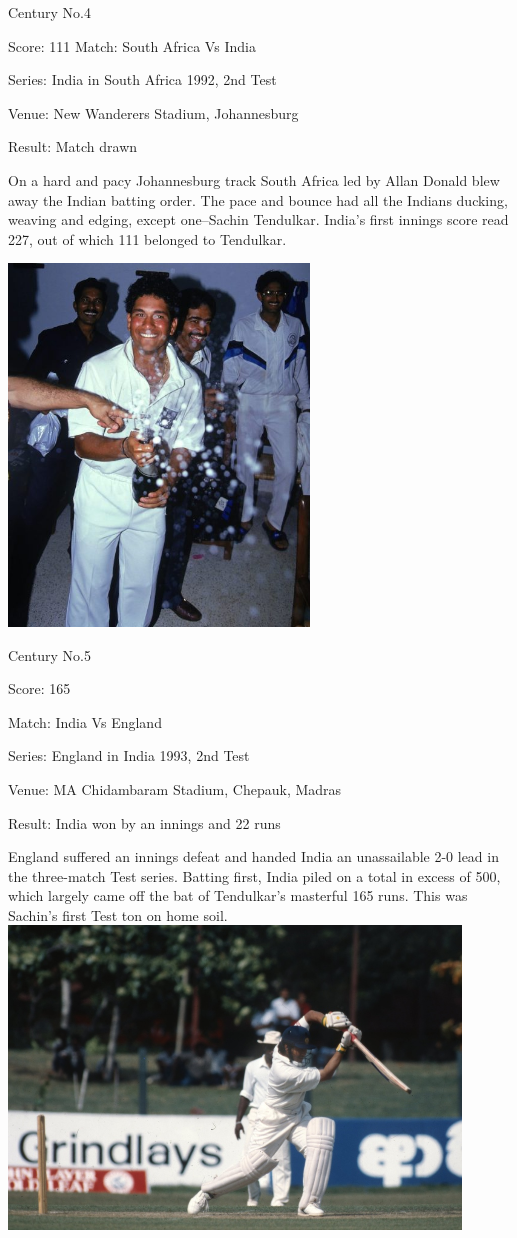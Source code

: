 \documentclass[11pt, a4paper]{article}
\begin{document}
Century No.4 

Score: 111 Match: South Africa Vs India 

Series: India in South Africa 1992, 2nd Test 

Venue: New Wanderers Stadium, Johannesburg 

Result: Match drawn 

On a hard and pacy Johannesburg track South Africa led by Allan Donald blew away the Indian batting order. The pace and bounce had all the Indians ducking, weaving and edging, except one--Sachin Tendulkar. India's first innings score read 227, out of which 111 belonged to Tendulkar.
\newpage
\begin{center}
\includegraphics[width=0.6\textwidth]{pics/5.jpg}
\end{center}

Century No.5 

Score: 165 

Match: India Vs England 

Series: England in India 1993, 2nd Test 

Venue: MA Chidambaram Stadium, Chepauk, Madras 

Result: India won by an innings and 22 runs 

England suffered an innings defeat and handed India an unassailable 2-0 lead in the three-match Test series. Batting first, India piled on a total in excess of 500, which largely came off the bat of Tendulkar's masterful 165 runs. This was Sachin's first Test ton on home soil.
\newpage
\includegraphics[width=0.9\textwidth]{pics/6.jpg}
\end{document}
